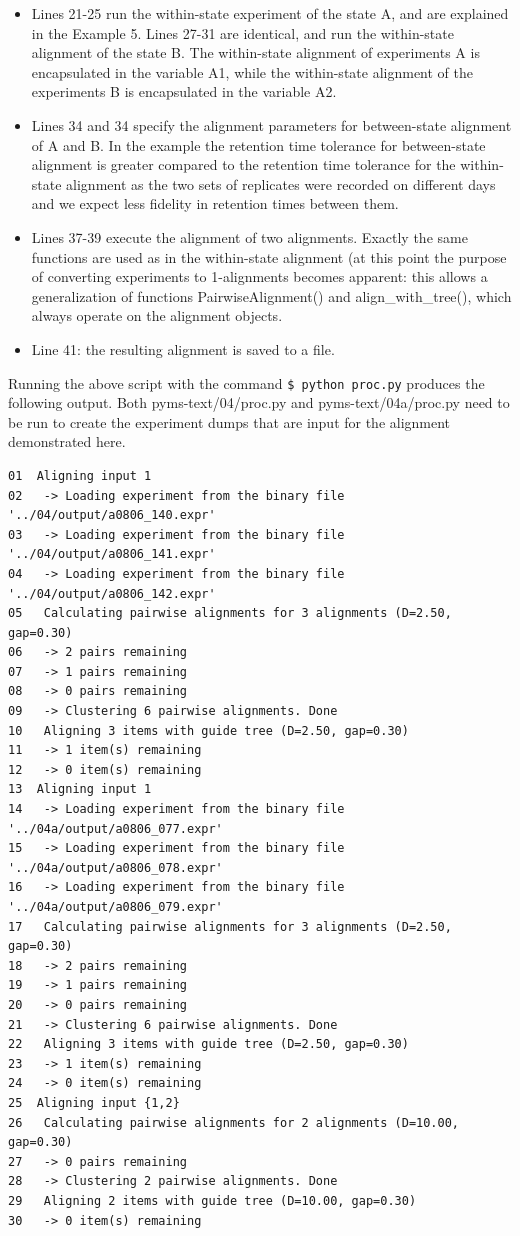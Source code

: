 \begin{itemize}
\item Lines 21-25 run the within-state experiment of the state A, and are
explained in the Example 5. Lines 27-31 are identical, and run the
within-state alignment of the state B. The within-state alignment of
experiments A is encapsulated in the variable A1, while the within-state
alignment of the experiments B is encapsulated in the variable A2.
\item Lines 34 and 34 specify the alignment parameters for between-state
alignment of A and B. In the example the retention time tolerance for
between-state alignment is greater compared to the retention time tolerance
for the within-state alignment as the two sets of replicates were
recorded on different days and we expect less fidelity in retention times
between them.
\item Lines 37-39 execute the alignment of two alignments. Exactly the
same functions are used as in the within-state alignment (at this point
the purpose of converting experiments to 1-alignments becomes apparent:
this allows a generalization of functions PairwiseAlignment() and
align\_with\_tree(), which always operate on the alignment objects.
\item Line 41: the resulting alignment is saved to a file.
\end{itemize}

Running the above script with the command {\tt \$ python proc.py} produces
the following output. Both pyms-text/04/proc.py and pyms-text/04a/proc.py
need to be run to create the experiment dumps that are input for the
alignment demonstrated here.

\begin{verbatim}
01  Aligning input 1
02   -> Loading experiment from the binary file '../04/output/a0806_140.expr'
03   -> Loading experiment from the binary file '../04/output/a0806_141.expr'
04   -> Loading experiment from the binary file '../04/output/a0806_142.expr'
05   Calculating pairwise alignments for 3 alignments (D=2.50, gap=0.30)
06   -> 2 pairs remaining
07   -> 1 pairs remaining
08   -> 0 pairs remaining
09   -> Clustering 6 pairwise alignments. Done
10   Aligning 3 items with guide tree (D=2.50, gap=0.30)
11   -> 1 item(s) remaining
12   -> 0 item(s) remaining
13  Aligning input 1
14   -> Loading experiment from the binary file '../04a/output/a0806_077.expr'
15   -> Loading experiment from the binary file '../04a/output/a0806_078.expr'
16   -> Loading experiment from the binary file '../04a/output/a0806_079.expr'
17   Calculating pairwise alignments for 3 alignments (D=2.50, gap=0.30)
18   -> 2 pairs remaining
19   -> 1 pairs remaining
20   -> 0 pairs remaining
21   -> Clustering 6 pairwise alignments. Done
22   Aligning 3 items with guide tree (D=2.50, gap=0.30)
23   -> 1 item(s) remaining
24   -> 0 item(s) remaining
25  Aligning input {1,2}
26   Calculating pairwise alignments for 2 alignments (D=10.00, gap=0.30)
27   -> 0 pairs remaining
28   -> Clustering 2 pairwise alignments. Done
29   Aligning 2 items with guide tree (D=10.00, gap=0.30)
30   -> 0 item(s) remaining
\end{verbatim}

